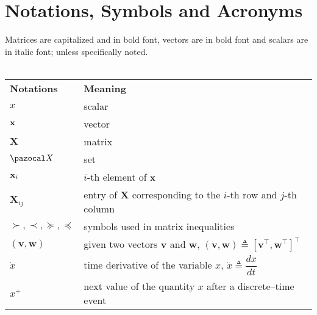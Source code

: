 \chapter*{Notations, Symbols and Acronyms}
\label{symbols_notations}

Matrices are capitalized and in bold font, vectors are in bold font and scalars are in italic font; unless specifically noted.
\mbox{}\\
\mbox{}\\
\begin{tabularx}{0.95\textwidth}{p{2.75cm} X}
 \textbf{Notations} 	&\textbf{Meaning}\\
 $x$                    & scalar\\
 $\mathbf{x}$                  & vector\\
 $\mathbf{X}$           & matrix\\
 $\X$                   & set\\
 $\mathbf{x}_i$                &$i$-th element of $\mathbf{x}$\\
 $\mathbf{X}_{ij}$      &entry of $\mathbf{X}$ corresponding to the $i$-th row and $j$-th column\\
 $\succ,\prec,\succeq,\preceq$ & symbols used in matrix inequalities\\
 $(\mathbf{v},\mathbf{w})$ & given two vectors $\mathbf{v}$ and $\mathbf{w}$,  $(\mathbf{v},\mathbf{w})\triangleq \left[\mathbf{v}^\top,\mathbf{w}^\top\right]^\top$ \\
 $\dot{x}$                   &time derivative of the variable $x$, $\dot{x}\triangleq\dfrac{dx}{dt}$\\
 $x^+$                  &next value of the quantity $x$ after a discrete--time event
\end{tabularx}

